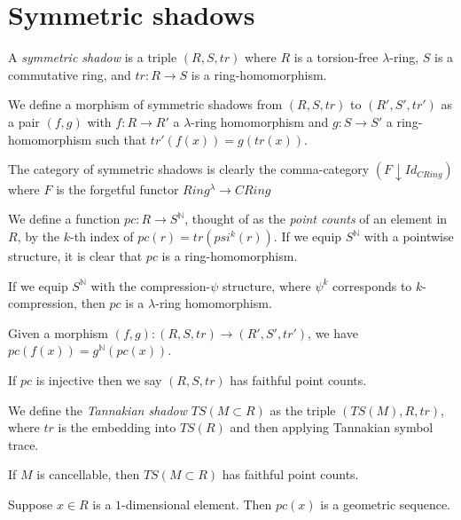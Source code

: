
\section{Symmetric shadows}

\begin{definition}
  A \emph{symmetric shadow} is a triple $(R, S, tr)$ where $R$ is a torsion-free $\lambda$-ring, $S$ is a commutative ring, and $tr: R \to S$ is a ring-homomorphism.  
\end{definition}

\begin{definition}
  We define a morphism of symmetric shadows from $(R, S, tr)$ to $(R', S', tr')$ as a pair $(f, g)$ with $f : R \to R'$ a $\lambda$-ring homomorphism and $g : S \to S'$ a ring-homomorphism such that $tr'(f(x)) = g(tr(x))$.
\end{definition}

\begin{remark}
  The category of symmetric shadows is clearly the comma-category $(F \downarrow Id_{CRing})$ where $F$ is the forgetful functor $Ring^{\lambda} \to CRing$
\end{remark}

\begin{definition}
  We define a function $pc : R \to S^{\mathbb{N}}$, thought of as the \emph{point counts} of an element in $R$, by the $k$-th index of $pc(r) = tr(psi^k(r))$. If we equip $S^{\mathbb{N}}$ with a pointwise structure, it is clear that $pc$ is a ring-homomorphism. 
\end{definition}

\begin{proposition}
  If we equip $S^{\mathbb{N}}$ with the compression-$\psi$ structure, where $\psi^k$ corresponds to $k$-compression, then $pc$ is a $\lambda$-ring homomorphism.
\end{proposition}

\begin{proposition}
  Given a morphism $(f, g) : (R, S, tr) \to (R', S', tr')$, we have $pc(f(x)) = g^{\mathbb{N}}(pc(x))$.
\end{proposition}

\begin{definition}
  If $pc$ is injective then we say $(R, S, tr)$ has faithful point counts. 
\end{definition}

\begin{definition}
  We define the \emph{Tannakian shadow} $TS(M \subset R)$ as the triple $(TS(M), R, tr)$, where $tr$ is the embedding into $TS(R)$ and then applying Tannakian symbol trace. 
\end{definition}

\begin{proposition}
  If $M$ is cancellable, then $TS(M \subset R)$ has faithful point counts. 
\end{proposition}


\begin{proposition}
  Suppose $x \in R$ is a $1$-dimensional element. Then $pc(x)$ is a geometric sequence.
\end{proposition}
